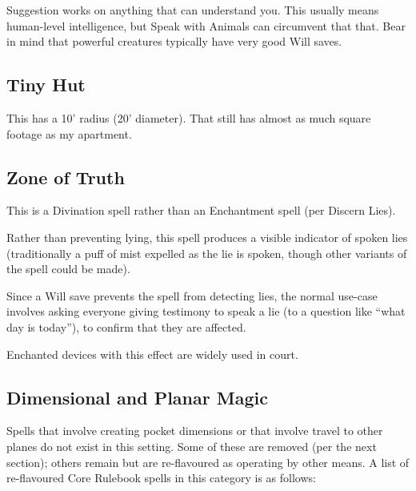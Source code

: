 Suggestion works on anything that can understand you. This usually means
human-level intelligence, but Speak with Animals can circumvent that that.
Bear in mind that powerful creatures typically have very good Will saves.
%

%
\subsection{Tiny Hut}

This has a 10' radius (20' diameter). That still has almost as much square
footage as my apartment.
%

%
\subsection{Zone of Truth}

This is a Divination spell rather than an Enchantment spell (per Discern
Lies).

Rather than preventing lying, this spell produces a visible indicator of
spoken lies (traditionally a puff of mist expelled as the lie is spoken,
though other variants of the spell could be made).

Since a Will save prevents the spell from detecting lies, the normal
use-case involves asking everyone giving testimony to speak a lie (to a
question like ``what day is today''), to confirm that they are affected.

Enchanted devices with this effect are widely used in court.
%

%
\subsection{Dimensional and Planar Magic}

Spells that involve creating pocket dimensions or that involve travel to
other planes do not exist in this setting. Some of these are removed (per
the next section); others remain but are re-flavoured as operating by
other means. A list of re-flavoured Core Rulebook spells in this category
is as follows:

